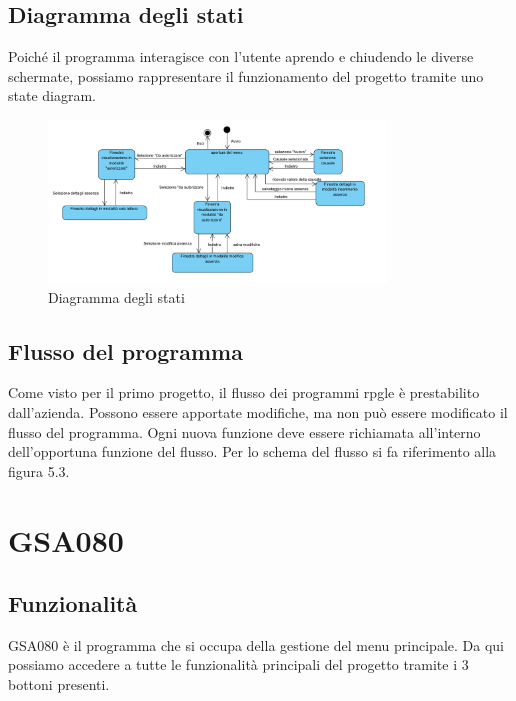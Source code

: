 \documentclass[target=bach,aauheader=,style=]{thud}
\begin{document}
\subsection{Diagramma degli stati}
Poiché il programma interagisce con l'utente aprendo e chiudendo le diverse schermate, possiamo rappresentare il funzionamento del progetto tramite uno state diagram.

\begin{figure}[H]
    \centering
    \includegraphics[width=0.8\textwidth]{diagrammi/state progetto finale.png}
    \caption{Diagramma degli stati}
\end{figure}

\newpage
\subsection{Flusso del programma}
Come visto per il primo progetto, il flusso dei programmi rpgle è prestabilito dall'azienda.
Possono essere apportate modifiche, ma non può essere modificato il flusso del programma.
Ogni nuova funzione deve essere richiamata all'interno dell'opportuna funzione del flusso.
Per lo schema del flusso si fa riferimento alla figura 5.3.


\section{GSA080}
\subsection{Funzionalità}
GSA080 è il programma che si occupa della gestione del menu principale. Da qui possiamo accedere a tutte le funzionalità principali del progetto tramite i 3 bottoni presenti.
\end{document}

